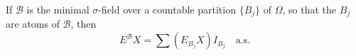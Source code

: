 If $\mathcal{B}$ is the minimal $\sigma$-field over a countable partition $\{B_j\}$ of $\Omega$, so that the $B_j$ are atoms of $\mathcal{B}$, then $$E^{\mathcal{B}}X = \sum (E_{B_j}X) I_{B_j} \quad \text{a.s.}$$
